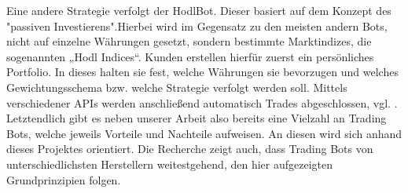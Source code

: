 Eine andere Strategie verfolgt der HodlBot. Dieser basiert auf dem Konzept des "passiven
Investierens".\newline Hierbei wird im Gegensatz zu den meisten andern Bots, nicht auf einzelne Währungen
gesetzt, sondern bestimmte Marktindizes, die sogenannten „Hodl Indices“. Kunden erstellen hierfür
zuerst ein persönliches Portfolio. In dieses halten sie fest, welche Währungen sie bevorzugen und
welches Gewichtungsschema bzw. welche Strategie verfolgt werden soll. Mittels verschiedener APIs
werden anschließend automatisch Trades abgeschlossen, vgl. \cite{gekko}.\newline
Letztendlich gibt es neben unserer Arbeit also bereits eine Vielzahl an Trading Bots, welche jeweils
Vorteile und Nachteile aufweisen. An diesen wird sich anhand dieses Projektes orientiert. Die
Recherche zeigt auch, dass Trading Bots von unterschiedlichsten Herstellern weitestgehend, den hier
aufgezeigten Grundprinzipien folgen.
